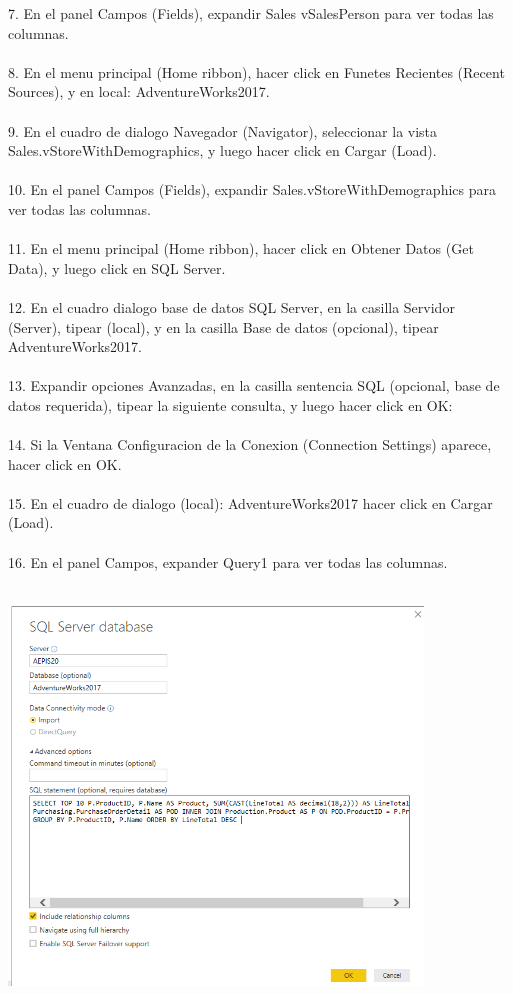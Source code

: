 \documentclass[12pt,letterpaper]{article}
\begin{document}
7. En el panel Campos (Fields), expandir Sales vSalesPerson para ver todas las columnas.\\\\ 
8. En el menu principal (Home ribbon), hacer click en Funetes Recientes (Recent Sources), y en local: AdventureWorks2017.\\\\ 
9. En el cuadro de dialogo Navegador (Navigator), seleccionar la vista Sales.vStoreWithDemographics, y luego
hacer click en Cargar (Load).\\\\ 
10. En el panel Campos (Fields), expandir Sales.vStoreWithDemographics para ver todas las columnas.\\\\ 
11. En el menu principal (Home ribbon), hacer click en Obtener Datos (Get Data), y luego click en SQL Server.\\\\ 
12. En el cuadro dialogo base de datos SQL Server, en la casilla Servidor (Server), tipear (local), y en la casilla
Base de datos (opcional), tipear AdventureWorks2017.\\\\ 
13. Expandir opciones Avanzadas, en la casilla sentencia SQL (opcional, base de datos requerida), tipear la
siguiente consulta, y luego hacer click en OK:\\\\ 
14. Si la Ventana Configuracion de la Conexion (Connection Settings) aparece, hacer click en OK.\\\\ 
15. En el cuadro de dialogo (local): AdventureWorks2017 hacer click en Cargar (Load).\\\\ 
16. En el panel Campos, expander Query1 para ver todas las columnas.\\\\ 
\begin{center}
\includegraphics[width=11cm]{IMG/3.png} 
\end{center}
\end{document}
